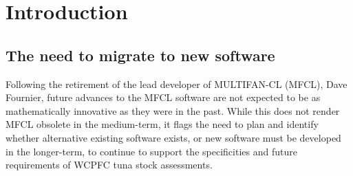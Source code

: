 \documentclass{SCreport}
\begin{document}
\newpage

\section{Introduction}


\subsection{The need to migrate to new software}

Following the retirement of the lead developer of MULTIFAN-CL (MFCL), Dave
Fournier, future advances to the MFCL software are not expected to be as
mathematically innovative as they were in the past. While this does not render
MFCL obsolete in the medium-term, it flags the need to plan and identify whether
alternative existing software exists, or new software must be developed in the
longer-term, to continue to support the specificities and future requirements of
WCPFC tuna stock assessments.
\end{document}

